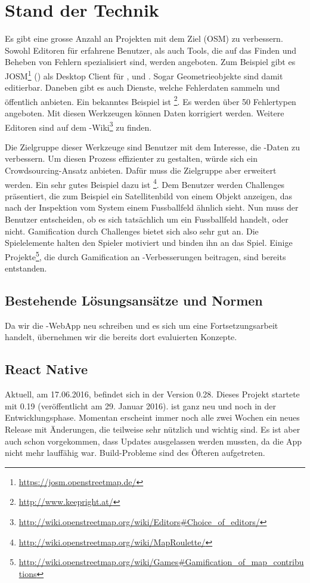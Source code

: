 \chapter{Stand der Technik}
\label{tb-stand-der-technik}
Es gibt eine grosse Anzahl an Projekten mit dem Ziel  (OSM) zu verbessern.
Sowohl Editoren für erfahrene Benutzer, als auch Tools, die auf das Finden und Beheben von Fehlern spezialisiert sind, werden angeboten.
Zum Beispiel gibt es JOSM\footnote{\url{https://josm.openstreetmap.de/}} () als Desktop Client für ,  und .
Sogar Geometrieobjekte sind damit editierbar.
Daneben gibt es auch Dienste, welche Fehlerdaten sammeln und öffentlich anbieten.
Ein bekanntes Beispiel ist \footnote{\url{http://www.keepright.at/}}.
Es werden über 50 Fehlertypen angeboten.
Mit diesen Werkzeugen können Daten korrigiert werden.
Weitere Editoren sind auf dem -Wiki\footnote{\url{http://wiki.openstreetmap.org/wiki/Editors\#Choice_of_editors/}} zu finden.

Die Zielgruppe dieser Werkzeuge sind Benutzer mit dem Interesse, die -Daten zu verbessern.
Um diesen Prozess effizienter zu gestalten, würde sich ein \gls{Crowdsourcing}-Ansatz anbieten.
Dafür muss die Zielgruppe aber erweitert werden.
Ein sehr gutes Beispiel dazu ist \footnote{\url{http://wiki.openstreetmap.org/wiki/MapRoulette/}}.
Dem Benutzer werden Challenges präsentiert, die zum Beispiel ein Satellitenbild von einem Objekt anzeigen, das nach der Inspektion vom System einem Fussballfeld ähnlich sieht.
Nun muss der Benutzer entscheiden, ob es sich tatsächlich um ein Fussballfeld handelt, oder nicht.
\gls{Gamification} durch Challenges bietet sich also sehr gut an.
Die Spielelemente halten den Spieler motiviert und binden ihn an das Spiel.
Einige Projekte\footnote{\url{http://wiki.openstreetmap.org/wiki/Games\#Gamification_of_map_contributions}}, die durch Gamification an -Verbesserungen beitragen, sind bereits entstanden.\cite{ba-kort-2012}

\section{Bestehende Lösungsansätze und Normen}
Da wir die \kort{}-\gls{WebApp} neu schreiben und es sich um eine Fortsetzungsarbeit handelt, übernehmen wir die bereits dort evaluierten Konzepte.


\section{React Native}
Aktuell, am 17.06.2016, befindet sich  in der Version 0.28.
Dieses Projekt startete mit  0.19 (veröffentlicht am 29. Januar 2016).
 ist ganz neu und noch in der Entwicklungsphase.
Momentan erscheint immer noch alle zwei Wochen ein neues Release mit Änderungen, die teilweise sehr nützlich und wichtig sind.
Es ist aber auch schon vorgekommen, dass Updates ausgelassen werden mussten, da die App nicht mehr lauffähig war.
Build-Probleme sind des Öfteren aufgetreten.

